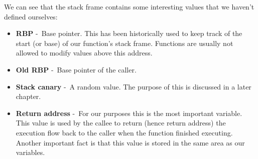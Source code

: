 \documentclass{article}
\begin{document}
We can see that the stack frame contains some interesting values that we haven't defined ourselves:
\begin{itemize}
  \item \textbf{RBP} -~Base pointer. This has been historically used to keep
        track of the start (or base) of our function's stack frame. Functions are usually not allowed to modify values above this address.
  \item \textbf{Old RBP} -~Base pointer of the caller.
  \item \textbf{Stack canary} -~A random value. The purpose of this is discussed in a later chapter.
  \item \textbf{Return address} -~For our purposes this is the most important variable. This value is used by the callee to return (hence return address) the execution flow back to the caller when the function finished executing. Another important fact is that this value is stored in the same area as our variables.
\end{itemize}
\end{document}
